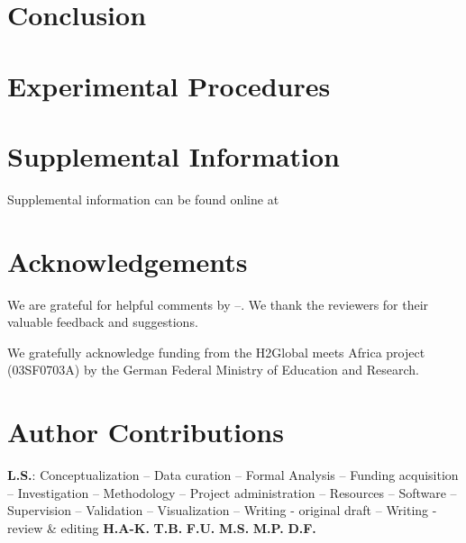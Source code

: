 \documentclass[5p]{elsarticle}
\begin{document}


\section{Conclusion}
\label{sec:conclusion}



\section{Experimental Procedures}
\label{sec:methods}








\section*{Supplemental Information}

Supplemental information can be found online at %

\section*{Acknowledgements}

We are grateful for helpful comments by --. We thank the
reviewers for their valuable feedback and suggestions.

We gratefully acknowledge funding from the H2Global meets Africa project (03SF0703A) by the German Federal Ministry of Education and Research.

\section*{Author Contributions}


\textbf{L.S.}:
Conceptualization --
Data curation --
Formal Analysis --
Funding acquisition --
Investigation --
Methodology --
Project administration --
Resources --
Software --
Supervision --
Validation --
Visualization --
Writing - original draft --
Writing - review \& editing
\textbf{H.A-K.}
\textbf{T.B.}
\textbf{F.U.}
\textbf{M.S.}
\textbf{M.P.}
\textbf{D.F.}
\end{document}
